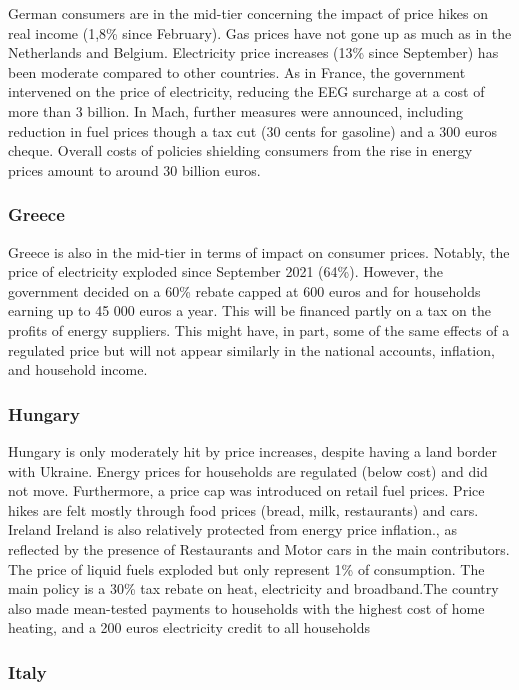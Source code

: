 \documentclass[
  9pt,
  a4paper,
  DIV=11,
  numbers=noendperiod]{scrartcl}
\begin{document}
German consumers are in the mid-tier concerning the impact of price
hikes on real income (1,8\% since February). Gas prices have not gone up
as much as in the Netherlands and Belgium. Electricity price increases
(13\% since September) has been moderate compared to other countries. As
in France, the government intervened on the price of electricity,
reducing the EEG surcharge at a cost of more than 3 billion. In Mach,
further measures were announced, including reduction in fuel prices
though a tax cut (30 cents for gasoline) and a 300 euros cheque. Overall
costs of policies shielding consumers from the rise in energy prices
amount to around 30 billion euros.

\hypertarget{greece}{%
\subsubsection{Greece}\label{greece}}

Greece is also in the mid-tier in terms of impact on consumer prices.
Notably, the price of electricity exploded since September 2021 (64\%).
However, the government decided on a 60\% rebate capped at 600 euros and
for households earning up to 45 000 euros a year. This will be financed
partly on a tax on the profits of energy suppliers. This might have, in
part, some of the same effects of a regulated price but will not appear
similarly in the national accounts, inflation, and household income.

\hypertarget{hungary}{%
\subsubsection{Hungary}\label{hungary}}

Hungary is only moderately hit by price increases, despite having a land
border with Ukraine. Energy prices for households are regulated (below
cost) and did not move. Furthermore, a price cap was introduced on
retail fuel prices. Price hikes are felt mostly through food prices
(bread, milk, restaurants) and cars. Ireland Ireland is also relatively
protected from energy price inflation., as reflected by the presence of
Restaurants and Motor cars in the main contributors. The price of liquid
fuels exploded but only represent 1\% of consumption. The main policy is
a 30\% tax rebate on heat, electricity and broadband.The country also
made mean-tested payments to households with the highest cost of home
heating, and a 200 euros electricity credit to all households

\hypertarget{italy}{%
\subsubsection{Italy}\label{italy}}
\end{document}
